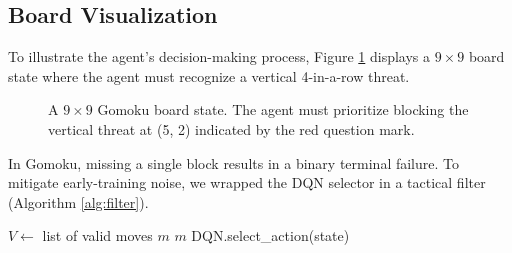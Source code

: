 \documentclass[9pt,a4paper,twocolumn,twoside]{rho-class/rho}
\begin{document}
    \subsection{Board Visualization}
        To illustrate the agent's decision-making process, Figure \ref{fig:board_vis} displays a $9\times9$ board state where the agent must recognize a vertical 4-in-a-row threat.

        \begin{figure}[h]
            \centering
            \caption{A $9\times9$ Gomoku board state. The agent must prioritize blocking the vertical threat at (5, 2) indicated by the red question mark.}
            \label{fig:board_vis}
        \end{figure}
        In Gomoku, missing a single block results in a binary terminal failure. To mitigate early-training noise, we wrapped the DQN selector in a tactical filter (Algorithm \ref{alg:filter}).

        \begin{algorithm}
        \caption{1-ply Tactical Filter}
        \label{alg:filter}
        \begin{algorithmic}
            \STATE $V \leftarrow$ list of valid moves
                    \RETURN $m$ 
                \ENDIF
            \ENDFOR
                    \RETURN $m$ 
                \ENDIF
            \ENDFOR
            \RETURN DQN.select\_action(state) 
        \end{algorithmic}
        \end{algorithm}
\end{document}
